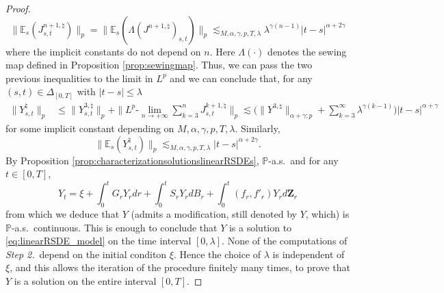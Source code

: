 \documentclass[11pt,a4paper]{article}
\newcommand{\E}{\mathbb{E}}
\theoremstyle{plain}
\begin{document}
\begin{proof}
\begin{equation*}
        \|\E_s(J^{n+1,\natural}_{s,t})\|_p = \|\E_s(\Lambda(J^{n+1,\natural})_{s,t})\|_p \lesssim_{M,\alpha,\gamma,p,T,\lambda} \lambda^{\gamma(n-1)} |t-s|^{\alpha+2\gamma}
    \end{equation*} where the implicit constants do not depend on $n$. Here $\Lambda(\cdot)$ denotes the sewing map defined in Proposition \ref{prop:sewingmap}.
    Thus, we can pass the two previous inequalities to the limit in $L^p$ and we can conclude that, for any $(s,t) \in \Delta_{[0,T]}$ with $|t-s|\le \lambda$
    \begin{equation*} \begin{aligned}
        \|Y^\natural_{s,t}\|_p &\le \|Y^{3,\natural}_{s,t}\|_p + \|L^p\text{-}\lim_{n \to +\infty} \sum_{k=3}^{n} J^{k+1,\natural}_{s,t}\|_p \lesssim \big(\|Y^{3,\natural}\|_{\alpha+\gamma;p} + \sum_{k=3}^{\infty} \lambda^{\gamma(k-1)} \big) |t-s|^{\alpha+\gamma} 
    \end{aligned}
    \end{equation*} for some implicit constant depending on ${M,\alpha,\gamma,p,T,\lambda}$. Similarly, $$\|\E_s(Y^\natural_{s,t})\|_p \lesssim_{M,\alpha,\gamma,p,T,\lambda} |t-s|^{\alpha+2\gamma}. $$
    By Proposition \ref{prop:characterizationsolutionslinearRSDEs}, $\mathbb{P}$-a.s.\ and for any $t \in [0,T]$, \begin{equation*}
        Y_t = \xi + \int_0^t G_r Y_r dr + \int_0^t S_r Y_r dB_r + \int_0^t (f_r,f'_r) Y_r d\mathbf{Z}_r
    \end{equation*}
    from which we deduce that $Y$ (admits a modification, still denoted by $Y$, which) is $\mathbb{P}$-a.s.\ continuous. 
    This is enough to conclude that $Y$ is a solution to \eqref{eq:linearRSDE_model} on the time interval $[0,\lambda]$. None of the computations of \textit{Step 2.}\ depend on the initial conditon $\xi$. Hence the choice of $\lambda$ is independent of $\xi$, and this allows the iteration of the procedure finitely many times, to prove that $Y$ is a solution on the entire interval $[0,T]$.
\end{proof}
\end{document}
